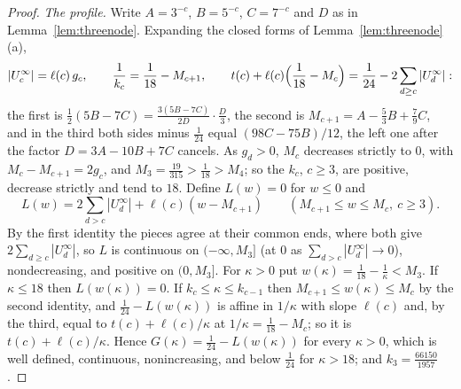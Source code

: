 \documentclass[11pt]{article}
\begin{document}
\begin{proof}
\emph{The profile.}  Write $A=3^{-c}$, $B=5^{-c}$, $C=7^{-c}$ and $D$ as in
Lemma~\ref{lem:threenode}.  Expanding the closed forms of
Lemma~\ref{lem:threenode}(a),
\begin{equation}\label{eq:profileid}
  |U^\infty_c|=\ell(c)\,g_c,\qquad
  \frac1{k_c}=\frac1{18}-M_{c+1},\qquad
  t(c)+\ell(c)\Bigl(\frac1{18}-M_c\Bigr)=\frac1{24}-2\sum_{d\ge c}|U^\infty_d| :
\end{equation}
the first is $\tfrac12(5B-7C)=\tfrac{3(5B-7C)}{2D}\cdot\tfrac D3$, the second is
$M_{c+1}=A-\tfrac53B+\tfrac79C$, and in the third both sides minus
$\tfrac1{24}$ equal $(98C-75B)/12$, the left one after the factor
$D=3A-10B+7C$ cancels.  As $g_d>0$, $M_c$ decreases strictly to $0$, with
$M_c-M_{c+1}=2g_c$, and $M_3=\tfrac{19}{315}>\tfrac1{18}>M_4$; so the $k_c$,
$c\ge3$, are positive, decrease strictly and tend to $18$.  Define $L(w)=0$
for $w\le0$ and
\[
  L(w)=2\sum_{d>c}|U^\infty_d|+\ell(c)(w-M_{c+1})\qquad
  (M_{c+1}\le w\le M_c,\ c\ge3).
\]
By the first identity the pieces agree at their common ends, where both
give $2\sum_{d\ge c}|U^\infty_d|$, so $L$ is continuous on $(-\infty,M_3]$
(at $0$ as $\sum_{d>c}|U^\infty_d|\to0$), nondecreasing, and positive on
$(0,M_3]$.  For $\kappa>0$ put $w(\kappa)=\tfrac1{18}-\tfrac1\kappa<M_3$.
If $\kappa\le18$ then $L(w(\kappa))=0$.  If $k_c\le\kappa\le k_{c-1}$ then
$M_{c+1}\le w(\kappa)\le M_c$ by the second identity, and
$\tfrac1{24}-L(w(\kappa))$ is affine in $1/\kappa$ with slope $\ell(c)$ and, by
the third, equal to $t(c)+\ell(c)/\kappa$ at $1/\kappa=\tfrac1{18}-M_c$;
so it is $t(c)+\ell(c)/\kappa$.  Hence $G(\kappa)=\tfrac1{24}-L(w(\kappa))$
for every $\kappa>0$, which is well defined, continuous, nonincreasing, and
below $\tfrac1{24}$ for $\kappa>18$; and $k_3=\tfrac{66150}{1957}$.


\end{proof}
\end{document}
